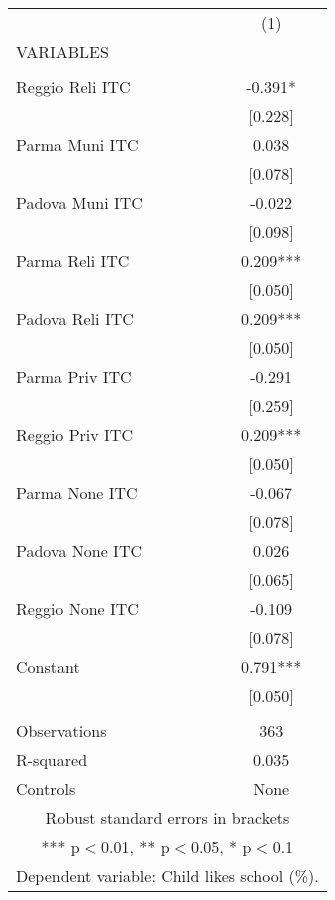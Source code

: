 \begin{tabular}{lc} \hline
 & (1) \\
VARIABLES &  \\ \hline
 &  \\
Reggio Reli ITC & -0.391* \\
 & [0.228] \\
Parma Muni ITC & 0.038 \\
 & [0.078] \\
Padova Muni ITC & -0.022 \\
 & [0.098] \\
Parma Reli ITC & 0.209*** \\
 & [0.050] \\
Padova Reli ITC & 0.209*** \\
 & [0.050] \\
Parma Priv ITC & -0.291 \\
 & [0.259] \\
Reggio Priv ITC & 0.209*** \\
 & [0.050] \\
Parma None ITC & -0.067 \\
 & [0.078] \\
Padova None ITC & 0.026 \\
 & [0.065] \\
Reggio None ITC & -0.109 \\
 & [0.078] \\
Constant & 0.791*** \\
 & [0.050] \\
 &  \\
Observations & 363 \\
R-squared & 0.035 \\
 Controls & None \\ \hline
\multicolumn{2}{c}{ Robust standard errors in brackets} \\
\multicolumn{2}{c}{ *** p$<$0.01, ** p$<$0.05, * p$<$0.1} \\
\multicolumn{2}{c}{ Dependent variable: Child likes school (\%).} \\
\end{tabular}
